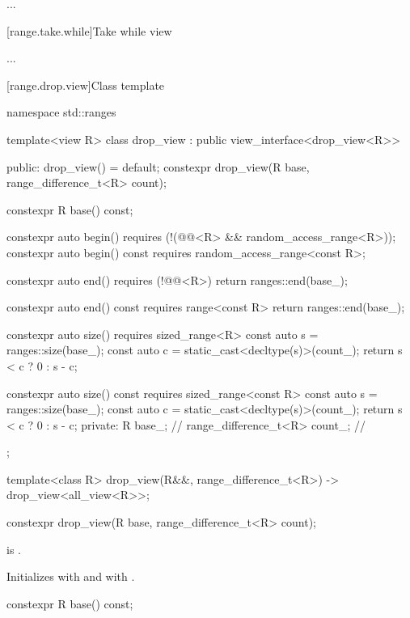 \documentclass{wg21}
\begin{document}
...

[range.take.while]{Take while view}

...

[range.drop.view]{Class template }

%
\begin{codeblock}
namespace std::ranges {
	template<view R>
	class drop_view : public view_interface<drop_view<R>> {
		public:
		drop_view() = default;
		constexpr drop_view(R base, range_difference_t<R> count);

		constexpr R base() const;

		constexpr auto begin()
		requires (!(@@<R> && random_access_range<R>));
		constexpr auto begin() const
		requires random_access_range<const R>;

		constexpr auto end()
		requires (!@@<R>)
		{ return ranges::end(base_); }

		constexpr auto end() const
		requires range<const R>
		{ return ranges::end(base_); }

		constexpr auto size()
		requires sized_range<R>
		{
			const auto s = ranges::size(base_);
			const auto c = static_cast<decltype(s)>(count_);
			return s < c ? 0 : s - c;
		}

		constexpr auto size() const
		requires sized_range<const R>
		{
			const auto s = ranges::size(base_);
			const auto c = static_cast<decltype(s)>(count_);
			return s < c ? 0 : s - c;
		}
		private:
		R base_;                                    // \expos
		range_difference_t<R> count_;               // \expos
	};

	template<class R>
	drop_view(R&&, range_difference_t<R>) -> drop_view<all_view<R>>;
}
\end{codeblock}

%
\begin{itemdecl}
constexpr drop_view(R base, range_difference_t<R> count);
\end{itemdecl}

\begin{itemdescr}
\pnum
\expects
{} is .

\pnum
\effects
Initializes  with  and
 with .
\end{itemdescr}

%
\begin{itemdecl}
constexpr R base() const;
\end{itemdecl}
\end{document}
